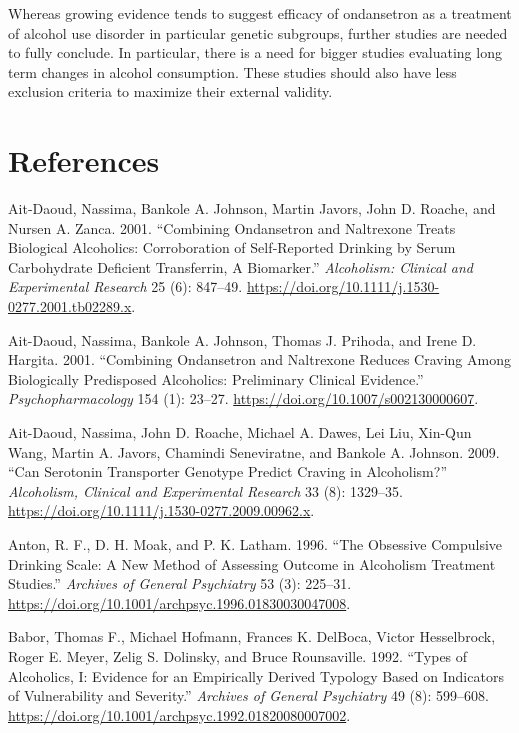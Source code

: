 \documentclass[
  12pt,
]{article}
\newlength{\cslhangindent}
\newenvironment{CSLReferences}[2] %
 {\begin{list}{}{%
  \setlength{\itemindent}{0pt}
  \setlength{\leftmargin}{0pt}
  \setlength{\parsep}{0pt}
  \ifodd #1
   \setlength{\leftmargin}{\cslhangindent}
   \setlength{\itemindent}{-1\cslhangindent}
  \fi
  \setlength{\itemsep}{#2\baselineskip}}}
 {\end{list}}
\begin{document}
Whereas growing evidence tends to suggest efficacy of ondansetron as a
treatment of alcohol use disorder in particular genetic subgroups,
further studies are needed to fully conclude. In particular, there is a
need for bigger studies evaluating long term changes in alcohol
consumption. These studies should also have less exclusion criteria to
maximize their external validity.

\section{References}\label{references}

\label{refs}
\begin{CSLReferences}{1}{0}
Ait‐Daoud, Nassima, Bankole A. Johnson, Martin Javors, John D. Roache,
and Nursen A. Zanca. 2001. {``Combining {Ondansetron} and {Naltrexone
Treats Biological Alcoholics}: {Corroboration} of {Self}‐{Reported
Drinking} by {Serum Carbohydrate Deficient Transferrin}, {A
Biomarker}.''} \emph{Alcoholism: Clinical and Experimental Research} 25
(6): 847--49. \url{https://doi.org/10.1111/j.1530-0277.2001.tb02289.x}.

Ait-Daoud, Nassima, Bankole A. Johnson, Thomas J. Prihoda, and Irene D.
Hargita. 2001. {``Combining Ondansetron and Naltrexone Reduces Craving
Among Biologically Predisposed Alcoholics: Preliminary Clinical
Evidence.''} \emph{Psychopharmacology} 154 (1): 23--27.
\url{https://doi.org/10.1007/s002130000607}.

Ait-Daoud, Nassima, John D. Roache, Michael A. Dawes, Lei Liu, Xin-Qun
Wang, Martin A. Javors, Chamindi Seneviratne, and Bankole A. Johnson.
2009. {``Can Serotonin Transporter Genotype Predict Craving in
Alcoholism?''} \emph{Alcoholism, Clinical and Experimental Research} 33
(8): 1329--35. \url{https://doi.org/10.1111/j.1530-0277.2009.00962.x}.

Anton, R. F., D. H. Moak, and P. K. Latham. 1996. {``The Obsessive
Compulsive Drinking Scale: {A} New Method of Assessing Outcome in
Alcoholism Treatment Studies.''} \emph{Archives of General Psychiatry}
53 (3): 225--31.
\url{https://doi.org/10.1001/archpsyc.1996.01830030047008}.

Babor, Thomas F., Michael Hofmann, Frances K. DelBoca, Victor
Hesselbrock, Roger E. Meyer, Zelig S. Dolinsky, and Bruce Rounsaville.
1992. {``Types of {Alcoholics}, {I}: {Evidence} for an {Empirically
Derived Typology Based} on {Indicators} of {Vulnerability} and
{Severity}.''} \emph{Archives of General Psychiatry} 49 (8): 599--608.
\url{https://doi.org/10.1001/archpsyc.1992.01820080007002}.


\end{CSLReferences}
\end{document}
